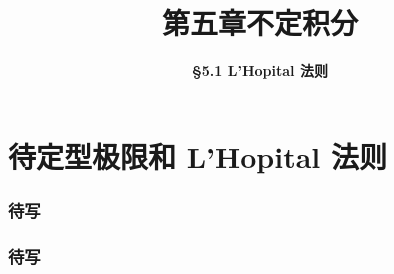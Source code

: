 \everymath{\displaystyle}



\title[第五章\\
不定积分]{\texorpdfstring{\LARGE \bfseries 第五章\quad 不定积分}{第五章 不定积分}} %
\author[\smaller \S 5.2\\
L'Hopital 法则] %
{\Large \bfseries \S 5.1 L'Hopital 法则}
\date{}





\begin{frame}

\titlepage %

\end{frame}



\section{待定型极限和 L'Hopital 法则}


\begin{frame}
\frametitle{待写}

\end{frame}


\begin{frame}
\frametitle{待写}

\end{frame}


